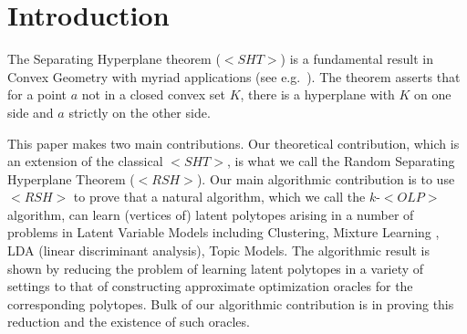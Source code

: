 \documentclass[11pt,letterpaper]{article}
\newcounter{note}[section]
\def\mathsf#1{<#1>}%
\def\xspace{}%
\theoremstyle{definition}
\theoremstyle{remark}
\newcommand{\rsh}{{\mathsf {RSH}}\xspace}
\newcommand{\sht}{{\mathsf {SHT}}\xspace}
\newcommand{\olp}{{\mathsf {OLP}}\xspace}
\newcommand{\kolp}{k\mbox{-}\olp}
\newcommand{\Hausdorf}{\mathsf {Hausdorff}\xspace }
\begin{document}
\begin{abstract}
$\rsh$  has algorithmic applications in learning polytopes. We consider a fundamental problem, denoted the ``$\Hausdorf$ problem'', of learning a unit diameter polytope $K$ within Hausdorff distance $\delta$,  given an optimization oracle for $K$.
Using $\rsh$, we show that with polynomially many random queries to the optimization oracle, $K$ can be approximated within error  $O(\delta)$. 
To our knowledge this is the first provable algorithm for the $\Hausdorf$ Problem.  Building on this result, we show that if the vertices of $K$ are well-separated, then an optimization oracle can be used to generate a list of points, each within Hausdorff distance $O(\delta)$  of $K$, with the property that the list contains a point close to each vertex of $K$. %
Further, we show how to prune this list to generate a (unique) approximation to each vertex of the polytope. We prove that in many latent variable settings, e.g., topic modeling, LDA,  optimization oracles do exist provided we project to a suitable SVD subspace. Thus, our work  yields the first efficient algorithm for finding approximations  to the vertices of the latent polytope under the well-separatedness assumption. This assumption states that each vertex of  $K$ is far from the convex hull of the remaining vertices of $K$, and is much weaker than other assumptions behind algorithms in the literature which find vertices of the latent polytope. 
\end{abstract}
\thispagestyle{empty}
\newpage
\setcounter{page}{1}
\section{Introduction}
The Separating Hyperplane theorem ($\sht$) is a fundamental result in Convex Geometry with myriad applications (see e.g.~\cite{bertsekas2009convex}). The theorem asserts that for a point $a$ not in a closed convex set $K$, there is a hyperplane with $K$ on one side and $a$ strictly on the other side. 


This paper makes two main contributions.
Our theoretical contribution, which is an extension of the classical $\sht$,  is what we call the Random Separating Hyperplane Theorem ($\rsh$). Our main algorithmic contribution is to use $\rsh$ to prove that a natural algorithm, which we call the $\kolp$ algorithm, can learn (vertices of) latent polytopes arising in a number of problems in Latent Variable Models including Clustering, Mixture Learning , LDA (linear discriminant analysis), Topic Models.  The algorithmic result is shown by reducing the problem of learning latent polytopes in a variety of settings to that of constructing approximate optimization oracles for the corresponding polytopes. Bulk of our algorithmic contribution is in proving this reduction and the existence of such oracles. 
\end{document}
